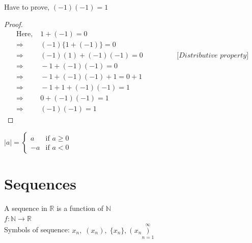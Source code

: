 \documentclass{article}
\newcommand{\Rw}{\Rightarrow}
\newcommand{\hs}{\hspace}
\begin{document}
\begin{theorem}{}{}
    Have to prove, $(-1)(-1)=1$
    \begin{proof}
        \begin{align*}
            \text{Here,} &\;1+(-1)=0\\
        \Rw &\;(-1)\{ 1+(-1)\}=0\\
        \Rw &\;(-1)(1)+(-1)(-1)=0 \hs{2cm} \textit{[Distributive property]}\\
        \Rw &\;-1 + (-1)(-1)=0\\
        \Rw &\;-1 + (-1)(-1)+1=0+1\\
        \Rw &\;-1+1+(-1)(-1)=1\\
        \Rw &\;0 +(-1)(-1)=1\\
        \Rw &\;(-1)(-1)=1
        \end{align*}
    \end{proof}
\end{theorem}
$|a|=
\begin{cases}
    a   & \text{if }a\geq 0\\
    -a&\text{if }a<0
\end{cases}
$
\section{Sequences}
A sequence in $\mathbb{R}$ is a function of $\mathbb{N}$ \\
$f:\mathbb{N}\to\mathbb{R}$\\
Symbols of sequence: $x_n,\; (x_n),\;\{x_n\},\; (\;x_n\mathop{)}\limits_{n=1}^\infty$
\end{document}
